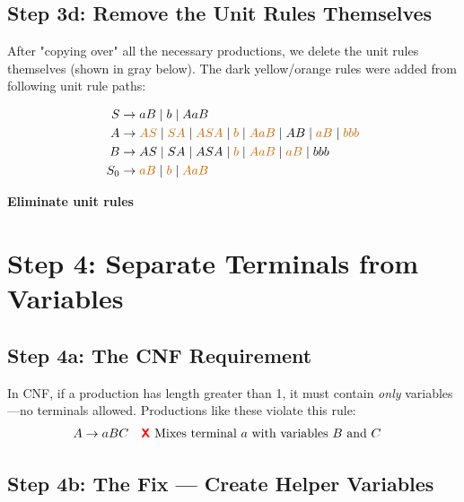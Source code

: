 \documentclass{article}
\begin{document}
\subsection{Step 3d: Remove the Unit Rules Themselves}

After "copying over" all the necessary productions, we delete the unit rules themselves (shown in gray below). The dark yellow/orange rules were added from following unit rule paths:

\begin{align*}
    S &\to aB \mid b \mid AaB\\
    A &\to \textcolor{orange!80!black}{AS} \mid \textcolor{orange!80!black}{SA} \mid \textcolor{orange!80!black}{ASA} \mid \textcolor{orange!80!black}{b} \mid \textcolor{orange!80!black}{AaB} \mid AB \mid \textcolor{orange!80!black}{aB} \mid \textcolor{orange!80!black}{bbb}\\
    B &\to AS \mid SA \mid ASA \mid \textcolor{orange!80!black}{b} \mid \textcolor{orange!80!black}{AaB} \mid \textcolor{orange!80!black}{aB} \mid bbb\\
    S_0 &\to \textcolor{orange!80!black}{aB} \mid \textcolor{orange!80!black}{b} \mid \textcolor{orange!80!black}{AaB}\\
    \end{align*}

\vspace{0.2cm}
\noindent\textcolor{green!60!black}{\textbf{ Eliminate unit rules}}



\section{Step 4: Separate Terminals from Variables}

\subsection{Step 4a: The CNF Requirement}

In CNF, if a production has length greater than 1, it must contain \textit{only} variables—no terminals allowed. Productions like these violate this rule:
\begin{align*}
    A &\to aBC \quad \textcolor{red}{\textbf{\textsf{X}}} \text{ Mixes terminal $a$ with variables $B$ and $C$}
\end{align*}

\subsection{Step 4b: The Fix — Create Helper Variables}
\end{document}
